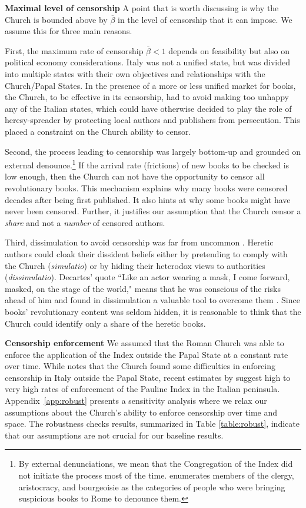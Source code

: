 \textbf{Maximal level of censorship} A point that is worth discussing is why the Church is bounded above by $\overline{\beta}$ in the level of censorship that it can impose. We assume this for three main reasons.

First, the maximum rate of censorship $\overline{\beta}<1$ depends on feasibility but also on political economy considerations. Italy was not a unified state, but was divided into multiple states with their own objectives and relationships with the Church/Papal States. In the presence of a more or less unified market for books, the Church, to be effective in its censorship, had to avoid making too unhappy any of the Italian states, which could have otherwise decided to play the role of heresy-spreader by protecting local authors and publishers from persecution. This placed a constraint on the Church ability to censor.

Second, the process leading to censorship was largely bottom-up and grounded on external denounce.\footnote{By external denunciations, we mean that the Congregation of the Index did not initiate the process most of the time.  enumerates members of the clergy, aristocracy, and bourgeoisie as the categories of people who were bringing suspicious books to Rome to denounce them.} If the arrival rate (frictions) of new books to be checked is low enough, then the Church can not have the opportunity to censor all revolutionary books. This mechanism explains why many books were censored decades after being first published. It also hints at why some books might have never been censored. Further, it justifies our assumption that the Church censor a \textit{share} and not a \textit{number} of censored authors.

Third, dissimulation to avoid censorship was far from uncommon \cite{Spruit2019}. Heretic authors could cloak their dissident beliefs either by pretending to comply with the Church (\textit{simulatio}) or by hiding their heterodox views to authorities (\textit{dissimulatio}). Decartes' quote ``Like an actor wearing a mask, I come forward, masked, on the stage of the world," means that he was conscious of the risks ahead of him and found in dissimulation a valuable tool to overcome them \cite{snyder2012}. Since books' revolutionary content was seldom hidden, it is reasonable to think that the Church could identify only a share of the heretic books.


\textbf{Censorship enforcement} We assumed that the Roman Church was able to enforce the application of the Index outside the Papal State at a constant rate over time. While  notes that the Church found some difficulties in enforcing censorship in Italy outside the Papal State, recent estimates by  suggest high to very high rates of enforcement of the Pauline Index in the Italian peninsula. Appendix~\ref{app:robust} presents a sensitivity analysis where we relax our assumptions about the Church's ability to enforce censorship over time and space. The robustness checks results, summarized in Table \ref{table:robust}, indicate that our assumptions are not crucial for our baseline results.

